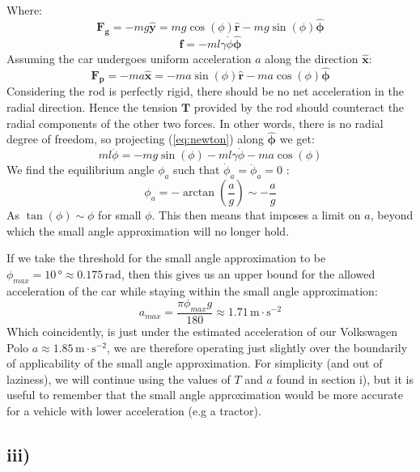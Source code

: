 \documentclass{article}
\begin{document}
Where:
\begin{equation}
    \bm{F_g} = -mg\bm{\hat y} = mg\cos(\phi)\bm{\hat r} - mg\sin(\phi)\bm{\hat \phi}
\end{equation}
\begin{equation}
    \bm{f} = -ml\gamma \dot\phi \bm{\hat \phi}
\end{equation}
Assuming the car undergoes uniform acceleration $a$ along the direction $\bm{\hat x}$:
\begin{equation}
    \bm{F_p} = -ma \bm{\hat x} = -ma \sin(\phi)\bm{\hat r} -ma\cos(\phi)\bm{\hat \phi}
\end{equation}
Considering the rod is perfectly rigid, there should be no net acceleration in the radial direction. 
Hence the tension $\bm{T}$ provided by the rod should counteract the radial components of the other two forces. 
In other words, there is no radial degree of freedom, so projecting (\ref{eq:newton}) along $\bm{\hat \phi}$ we get:
\begin{equation}
    ml\ddot\phi = -mg\sin(\phi) - ml\gamma \dot\phi - ma\cos(\phi)
\end{equation}
We find the equilibrium angle $\phi_a$ such that $\dot\phi_a = \ddot\phi_a = 0$ :
\begin{equation}
    \phi_a = - \arctan \left(\frac{a}{g}\right) \sim - \frac{a}{g}
\end{equation}
As $\tan(\phi) \sim \phi$ for small $\phi$. This then means that imposes a limit on $a$, 
beyond which the small angle approximation will no longer hold.

If we take the threshold for the small angle approximation to be $\phi_{max} = 10 \,\si{\degree} \approx 0.175 \,\si{\radian}$, 
then this gives us an upper bound for the allowed acceleration of the car while staying within the small angle approximation:
\begin{equation}
    a_{max} = \frac{\pi \phi_{max} g}{180} \approx 1.71 \,\si{\m\cdot\s^{-2}}
\end{equation}
Which coincidently, is just under the estimated acceleration of our Volkswagen Polo $a\approx 1.85 \,\si{\m\cdot\s^{-2}}$, 
we are therefore operating just slightly over the boundarily of applicability of 
the small angle approximation. For simplicity (and out of laziness), we will continue using the values of $T$ and $a$ found in section i), but it is useful to remember that the small angle approximation would be more accurate for a vehicle with lower acceleration (e.g a tractor).

\subsection*{iii)}
\end{document}
